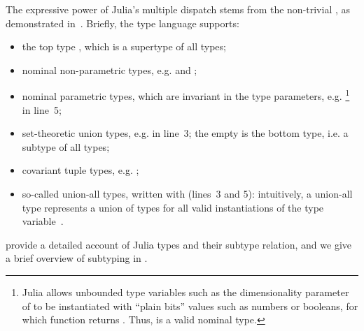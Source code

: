 The expressive power of Julia's multiple dispatch stems from 
the non-trivial , as
demonstrated in~.
Briefly, the type language supports:
\begin{itemize}
  \item the top type , which is a supertype of all types;
  \item nominal non-parametric types, e.g.  and ;
  \item nominal parametric types, which are invariant in the type parameters, 
        e.g. \footnote{Julia allows unbounded type
        variables such as the dimensionality parameter  
        of 
        to be instantiated with ``plain bits'' values such as numbers or
        booleans, for which
        \href{https://docs.julialang.org/en/v1/base/base/\#Base.isbits}{}
        function returns .
        Thus,  is a valid nominal type.}
        in line~5;
  \item set-theoretic union types, e.g. 
     in line~3;
    the empty  is the bottom type, i.e. a subtype
    of all types;
  \item covariant tuple types, e.g. ;
  \item so-called union-all types, written with  (lines~3 and 5):
    intuitively, a union-all type  represents a union of types
     for all valid instantiations  of the type
    variable~.
\end{itemize}
\citet{bib:zappa-nardelli:julia-sub:oopsla:2018} provide a detailed
account of Julia types and their subtype relation, and we give a brief
overview of subtyping in .


